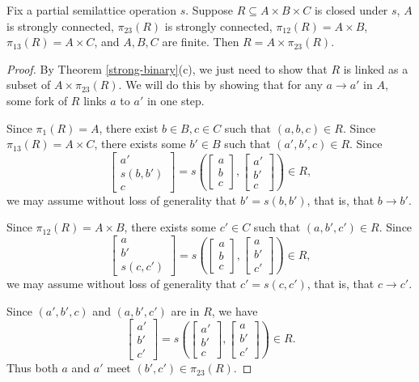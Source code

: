 \documentclass[letterpaper,11pt]{article}
\begin{document}
\begin{thm}\label{strong-ternary} Fix a partial semilattice operation $s$. Suppose $R \subseteq A \times B \times C$ is closed under $s$, $A$ is strongly connected, $\pi_{23}(R)$ is strongly connected, $\pi_{12}(R) = A \times B$, $\pi_{13}(R) = A\times C$, and $A,B,C$ are finite. Then $R = A \times \pi_{23}(R)$.
\end{thm}
\begin{proof} By Theorem \ref{strong-binary}(c), we just need to show that $R$ is linked as a subset of $A \times \pi_{23}(R)$. We will do this by showing that for any $a \rightarrow a'$ in $A$, some fork of $R$ links $a$ to $a'$ in one step.

Since $\pi_1(R) = A$, there exist $b \in B, c \in C$ such that $(a,b,c) \in R$. Since $\pi_{13}(R) = A\times C$, there exists some $b' \in B$ such that $(a',b',c) \in R$. Since
\[
\begin{bmatrix} a'\\ s(b,b')\\ c\end{bmatrix} = s\left(\begin{bmatrix} a\\ b\\ c\end{bmatrix}, \begin{bmatrix} a'\\ b'\\ c\end{bmatrix}\right) \in R,
\]
we may assume without loss of generality that $b' = s(b,b')$, that is, that $b \rightarrow b'$.

Since $\pi_{12}(R) = A\times B$, there exists some $c' \in C$ such that $(a,b',c') \in R$. Since
\[
\begin{bmatrix} a\\ b'\\ s(c,c')\end{bmatrix} = s\left(\begin{bmatrix} a\\ b\\ c\end{bmatrix}, \begin{bmatrix} a\\ b'\\ c'\end{bmatrix}\right) \in R,
\]
we may assume without loss of generality that $c' = s(c,c')$, that is, that $c \rightarrow c'$.

Since $(a',b',c)$ and $(a,b',c')$ are in $R$, we have
\[
\begin{bmatrix} a'\\ b'\\ c'\end{bmatrix} = s\left(\begin{bmatrix} a'\\ b'\\ c\end{bmatrix}, \begin{bmatrix} a\\ b'\\ c'\end{bmatrix}\right) \in R.
\]
Thus both $a$ and $a'$ meet $(b',c') \in \pi_{23}(R)$.
\end{proof}
\end{document}
